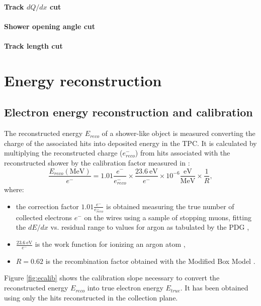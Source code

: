 \documentclass[a4paper]{article}
\begin{document}
\paragraph{Track $dQ/dx$ cut}

\paragraph{Shower opening angle cut}

\paragraph{Track length cut}


\section{Energy reconstruction}\label{sec:energyreco}
\subsection{Electron energy reconstruction and calibration}\label{sec:showerenergy}
The reconstructed energy $E_{reco}$ of a shower-like object is measured converting the charge of the associated hits into deposited energy in the TPC. It is calculated by multiplying the reconstructed charge ($e^{-}_{reco}$) from hits associated with the reconstructed shower by the calibration factor measured in \cite{michel}:
\begin{equation}
\frac{E_{reco} \mathrm{(MeV)}}{e^-} = 1.01\frac{e^-}{e^{-}_{reco}} \times \frac{23.6~\mathrm{eV}}{e^-} \times 10^{-6} \frac{\mathrm{eV}}{\mathrm{MeV}} \times \frac{1}{R},
\end{equation}
where:
\begin{itemize}

\item the correction factor $1.01\frac{e^-}{e^{-}_{reco}}$ is obtained measuring the true number of collected electrons $e^{-}$ on the wires using a sample of stopping muons, fitting the $dE/dx$ vs. residual range to values for argon as tabulated by the PDG \cite{pdg},
\item $\frac{23.6~\mathrm{eV}}{e^-}$ is the work function for ionizing an argon atom \cite{workfunction},
\item $R = 0.62$ is the recombination factor obtained with the Modified Box Model \cite{boxmodel}.
\end{itemize}
Figure \ref{fig:ecalib} shows the calibration slope necessary to convert the reconstructed energy $E_{reco}$ into true electron energy $E_{true}$. It has been obtained using only the hits reconstructed in the collection plane. 
\end{document}
